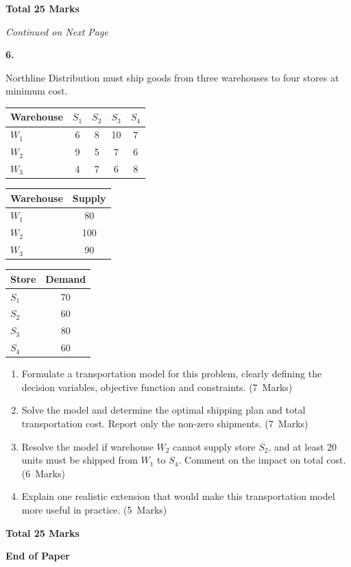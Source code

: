 \documentclass[11pt,a4paper]{article}
\newcommand{\continuednotice}{%
    \vfill
    \begin{center}
    \textit{Continued on Next Page}
    \end{center}
    \newpage
}
\newcommand{\markalloc}[1]{\nobreak\hfill\mbox{(#1 Marks)}}
\newcommand{\questiontotal}[1]{\begin{flushright}\textbf{Total #1 Marks}\end{flushright}}
\begin{document}
\questiontotal{25}

\continuednotice

\textbf{6.}

Northline Distribution must ship goods from three warehouses to four stores at minimum cost.

\begin{center}
\begin{tabular}{lcccc}
\toprule
Warehouse & $S_1$ & $S_2$ & $S_3$ & $S_4$ \\
\midrule
$W_1$ & 6 & 8 & 10 & 7 \\
$W_2$ & 9 & 5 & 7 & 6 \\
$W_3$ & 4 & 7 & 6 & 8 \\
\bottomrule
\end{tabular}
\end{center}

\begin{center}
\begin{tabular}{lc}
\toprule
Warehouse & Supply \\
\midrule
$W_1$ & 80 \\
$W_2$ & 100 \\
$W_3$ & 90 \\
\bottomrule
\end{tabular}
\hspace{1.5cm}
\begin{tabular}{lc}
\toprule
Store & Demand \\
\midrule
$S_1$ & 70 \\
$S_2$ & 60 \\
$S_3$ & 80 \\
$S_4$ & 60 \\
\bottomrule
\end{tabular}
\end{center}

\begin{enumerate}
\item Formulate a transportation model for this problem, clearly defining the decision variables, objective function and constraints. \markalloc{7}

\item Solve the model and determine the optimal shipping plan and total transportation cost. Report only the non-zero shipments. \markalloc{7}

\item Resolve the model if warehouse $W_2$ cannot supply store $S_2$, and at least 20 units must be shipped from $W_1$ to $S_4$. Comment on the impact on total cost. \markalloc{6}

\item Explain one realistic extension that would make this transportation model more useful in practice. \markalloc{5}
\end{enumerate}

\questiontotal{25}

\vfill

\begin{center}
\textbf{End of Paper}
\end{center}
\end{document}
